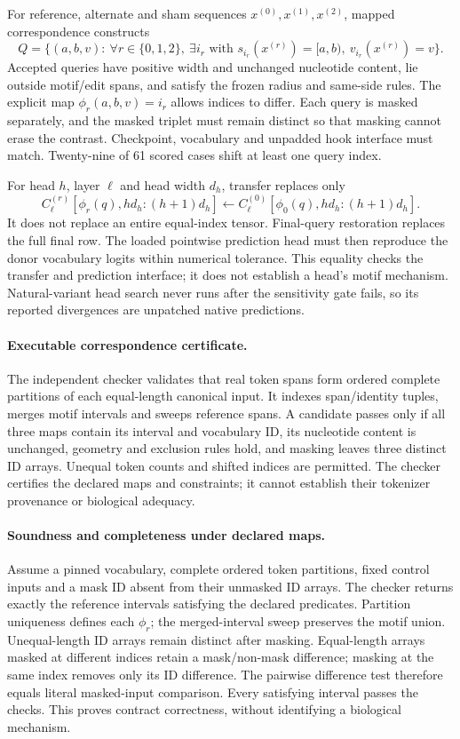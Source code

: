 \documentclass[10pt,letterpaper]{article}
\begin{document}
For reference, alternate and sham sequences $x^{(0)},x^{(1)},x^{(2)}$, mapped correspondence constructs
\[
Q=\{(a,b,v):\ \forall r\in\{0,1,2\},\ \exists i_r\text{ with }
s_{i_r}(x^{(r)})=[a,b),\ v_{i_r}(x^{(r)})=v\}.
\]
Accepted queries have positive width and unchanged nucleotide content, lie outside motif/edit spans, and satisfy the frozen radius and same-side rules. The explicit map $\phi_r(a,b,v)=i_r$ allows indices to differ. Each query is masked separately, and the masked triplet must remain distinct so that masking cannot erase the contrast. Checkpoint, vocabulary and unpadded hook interface must match. Twenty-nine of 61 scored cases shift at least one query index.

For head $h$, layer $\ell$ and head width $d_h$, transfer replaces only
\[
C^{(r)}_{\ell}[\phi_r(q),hd_h:(h+1)d_h]
\leftarrow C^{(0)}_{\ell}[\phi_0(q),hd_h:(h+1)d_h].
\]
It does not replace an entire equal-index tensor. Final-query restoration replaces the full final row. The loaded pointwise prediction head must then reproduce the donor vocabulary logits within numerical tolerance. This equality checks the transfer and prediction interface; it does not establish a head's motif mechanism. Natural-variant head search never runs after the sensitivity gate fails, so its reported divergences are unpatched native predictions.

\paragraph{Executable correspondence certificate.}
The independent checker validates that real token spans form ordered complete partitions of each equal-length canonical input. It indexes span/identity tuples, merges motif intervals and sweeps reference spans. A candidate passes only if all three maps contain its interval and vocabulary ID, its nucleotide content is unchanged, geometry and exclusion rules hold, and masking leaves three distinct ID arrays. Unequal token counts and shifted indices are permitted. The checker certifies the declared maps and constraints; it cannot establish their tokenizer provenance or biological adequacy.

\paragraph{Soundness and completeness under declared maps.}
Assume a pinned vocabulary, complete ordered token partitions, fixed control inputs and a mask ID absent from their unmasked ID arrays. The checker returns exactly the reference intervals satisfying the declared predicates. Partition uniqueness defines each $\phi_r$; the merged-interval sweep preserves the motif union. Unequal-length ID arrays remain distinct after masking. Equal-length arrays masked at different indices retain a mask/non-mask difference; masking at the same index removes only its ID difference. The pairwise difference test therefore equals literal masked-input comparison. Every satisfying interval passes the checks. This proves contract correctness, without identifying a biological mechanism.
\end{document}

